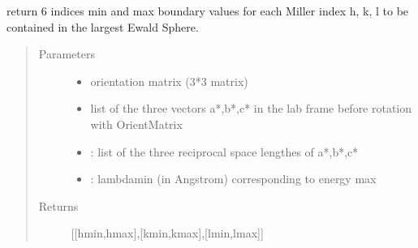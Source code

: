 \documentclass[letterpaper,10pt,english]{sphinxmanual}
\begin{document}
\begin{fulllineitems}
\label{\detokenize{Simulation_Module:LaueTools.lauecore.Quicklist}}
return 6 indices min and max boundary values for each Miller index h, k, l
to be contained in the largest Ewald Sphere.
\begin{quote}\begin{description}
\item[{Parameters}] \leavevmode\begin{itemize}
\item {} 
 \textendash{} orientation matrix (3*3 matrix)

\item {} 
 \textendash{} list of the three vectors a*,b*,c* in the lab frame
before rotation with OrientMatrix

\item {} 
 \textendash{} : list of the three reciprocal space lengthes of a*,b*,c*

\item {} 
 \textendash{} : lambdamin (in Angstrom) corresponding to energy max

\end{itemize}

\item[{Returns}] \leavevmode
{[}{[}hmin,hmax{]},{[}kmin,kmax{]},{[}lmin,lmax{]}{]}

\end{description}\end{quote}

\end{fulllineitems}

\end{document}
